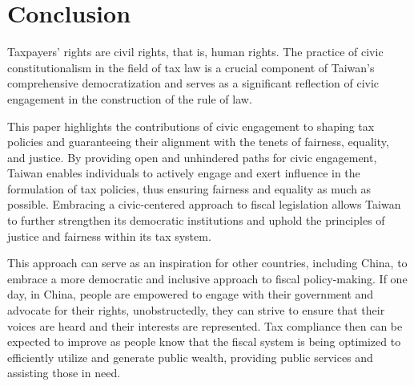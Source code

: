 \documentclass[]{article}
\begin{document}



\section{Conclusion}




Taxpayers' rights are civil rights, that is, human rights.
The practice of civic constitutionalism in the field of tax law is a crucial component of Taiwan's comprehensive democratization and serves as a significant reflection of civic engagement in the construction of the rule of law. 


This paper highlights the contributions of civic engagement to shaping tax policies and guaranteeing their alignment with the tenets of fairness, equality, and justice. 
By providing open and unhindered paths for civic engagement, Taiwan enables individuals to actively engage and exert influence in the formulation of tax policies, thus ensuring fairness and equality as much as possible. Embracing a civic-centered approach to fiscal legislation allows Taiwan to further strengthen its democratic institutions and uphold the principles of justice and fairness within its tax system. 





This approach can serve as an inspiration for other countries, including China, to embrace a more democratic and inclusive approach to fiscal policy-making.
If one day, in China, people are empowered to engage with their government and advocate for their rights, unobstructedly, they can strive to ensure that their voices are heard and their interests are represented. Tax compliance then can be expected to improve as people know that the fiscal system is being optimized to efficiently utilize and generate public wealth, providing public services and assisting those in need.
\end{document}
